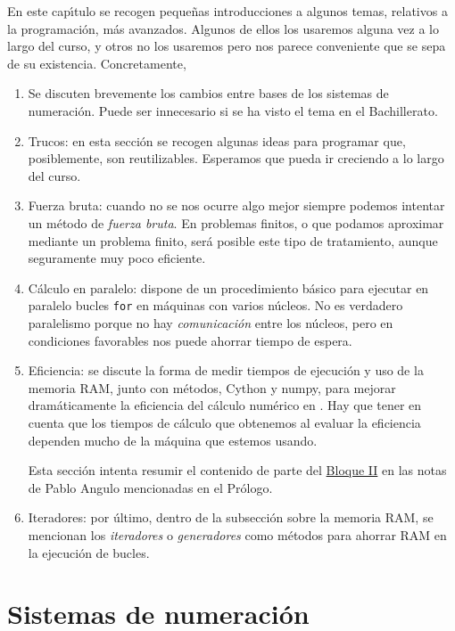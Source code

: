 
En este cap\'{\i}tulo se recogen peque\~nas introducciones a algunos temas,
relativos a la programaci\'on, m\'as avanzados. Algunos de ellos los usaremos
alguna vez a lo largo del curso, y otros no los usaremos pero nos parece
conveniente que se sepa de su existencia. Concretamente,
\begin{enumerate}
 \item Se discuten brevemente los cambios entre bases de los {\sc sistemas de
numeraci\'on}.  Puede ser innecesario si se ha visto el tema en el Bachillerato.
\item {\sc Trucos:} en esta secci\'on se recogen algunas ideas para programar
que, posiblemente, son reutilizables. Esperamos que pueda ir creciendo a lo
largo del curso.
\item {\sc Fuerza bruta:} cuando no se nos ocurre algo mejor siempre podemos
intentar un m\'etodo de {\itshape fuerza bruta}. En problemas finitos, o que
podamos aproximar mediante un problema finito,  ser\'a posible este tipo de
tratamiento,  aunque seguramente muy poco eficiente.
\item {\sc C\'alculo en paralelo:}  {\sage} dispone de un procedimiento b\'asico
para ejecutar en paralelo bucles \lstinline|for| en m\'aquinas con varios
n\'ucleos. No es verdadero paralelismo porque no hay {\itshape comunicaci\'on}
entre
los n\'ucleos, pero en condiciones favorables nos puede ahorrar tiempo de
espera.

\item{\sc Eficiencia:} se discute la forma de medir tiempos de ejecuci\'on y uso
de la memoria RAM, junto con m\'etodos, Cython y numpy, para mejorar
dram\'aticamente la eficiencia del c\'alculo num\'erico en \sage. Hay que tener
en cuenta que los tiempos de c\'alculo que obtenemos al evaluar la eficiencia
dependen mucho de la m\'aquina que estemos usando.

Esta secci\'on intenta resumir el contenido de parte del 
\href{
http://verso.mat.uam.es/~pablo.angulo/doc/laboratorio/bloqueII.html}
{Bloque II} en las notas de Pablo Angulo mencionadas en el Pr\'ologo.
 
 
 \item{\sc Iteradores:} por \'ultimo, dentro de la subsecci\'on sobre la memoria
RAM,  se mencionan los {\itshape iteradores} o
{\itshape generadores} como m\'etodos para ahorrar RAM en la ejecuci\'on de
bucles.
\end{enumerate}


\section{Sistemas de numeraci\'on}\label{bases-num}



